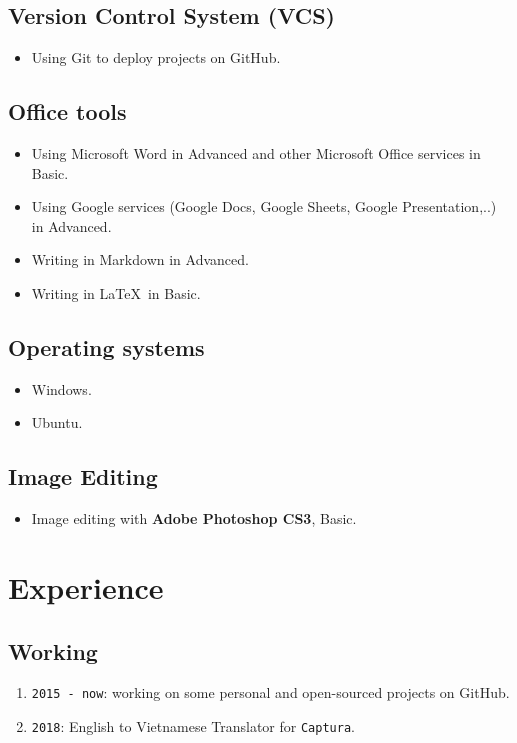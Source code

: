 \documentclass{article}
\begin{document}
        \subsection{Version Control System (VCS)}
        \begin{itemize}
            \item Using Git to deploy projects on GitHub.
        \end{itemize}

        \subsection{Office tools}
        \begin{itemize}
            \item Using Microsoft Word in Advanced and other Microsoft Office services in Basic.
            \item Using Google services (Google Docs, Google Sheets, Google Presentation,..) in Advanced.
            \item Writing in Markdown in Advanced.
            \item Writing in \LaTeX\ in Basic.
        \end{itemize}

        \subsection{Operating systems}
        \begin{itemize}
            \item Windows.
            \item Ubuntu.
        \end{itemize}

        \subsection{Image Editing}
        \begin{itemize}
            \item Image editing with \textbf{Adobe Photoshop CS3}, Basic.
        \end{itemize}

    \section{Experience}
        \subsection{Working}
            \begin{enumerate}
                \item \texttt{2015 - now}: working on some personal and open-sourced projects on GitHub.
                \item \texttt{2018}: English to Vietnamese Translator for \texttt{Captura}\cite{Captura}.
            \end{enumerate}
\end{document}
